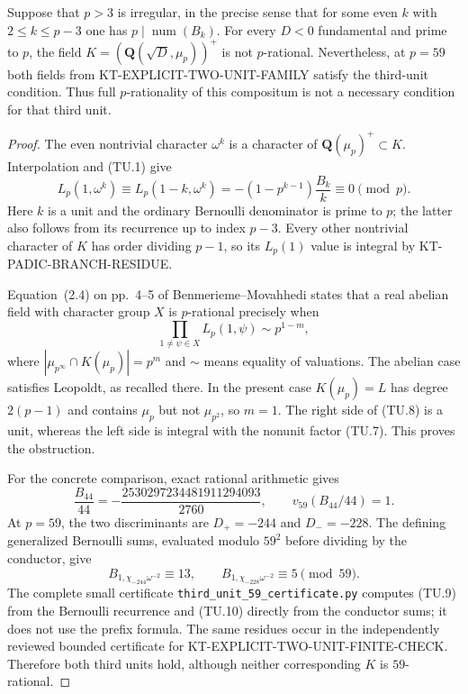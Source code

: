 \begin{proposition}
Suppose that $p>3$ is irregular, in the precise sense that for
some even $k$ with $2\le k\le p-3$ one has
$p\mid\operatorname{num}(B_k)$.  For every $D<0$ fundamental
and prime to $p$, the field
$K=(\mathbf Q(\sqrt D,\mu_p))^+$ is not $p$-rational.
Nevertheless, at $p=59$ both fields from
KT-EXPLICIT-TWO-UNIT-FAMILY satisfy the third-unit condition.
Thus full $p$-rationality of this compositum is not a necessary
condition for that third unit.
\end{proposition}
\begin{proof}
The even nontrivial character $\omega^k$ is a character of
$\mathbf Q(\mu_p)^+\subset K$.  Interpolation and (TU.1) give
\[
 L_p(1,\omega^k)\equiv L_p(1-k,\omega^k)
       =-(1-p^{k-1})\frac{B_k}{k}\equiv0\pmod p.          \tag{TU.7}
\]
Here $k$ is a unit and the ordinary Bernoulli denominator is
prime to $p$; the latter also follows from its recurrence up
to index $p-3$.  Every other nontrivial character of $K$ has
order dividing $p-1$, so its $L_p(1)$ value is integral by
KT-PADIC-BRANCH-RESIDUE.

Equation~(2.4) on pp.~4--5 of Benmerieme--Movahhedi states
that a real abelian field with character group $X$ is
$p$-rational precisely when
\[
             \prod_{1\ne\psi\in X}L_p(1,\psi)
                     \sim p^{1-m},                       \tag{TU.8}
\]
where $|\mu_{p^\infty}\cap K(\mu_p)|=p^m$ and $\sim$
means equality of valuations.  The abelian case satisfies
Leopoldt, as recalled there.  In the present case
$K(\mu_p)=L$ has degree $2(p-1)$ and contains $\mu_p$ but
not $\mu_{p^2}$, so $m=1$.  The right side of (TU.8) is a
unit, whereas the left side is integral with the nonunit
factor (TU.7).  This proves the obstruction.

For the concrete comparison, exact rational arithmetic gives
\[
 \frac{B_{44}}{44}
       =-\frac{2530297234481911294093}{2760},\qquad
       v_{59}(B_{44}/44)=1.                                \tag{TU.9}
\]
At $p=59$, the two discriminants are $D_+=-244$ and
$D_-=-228$.  The defining generalized Bernoulli sums, evaluated
modulo $59^2$ before dividing by the conductor, give
\[
 B_{1,\chi_{-244}\omega^{-2}}\equiv13,\qquad
 B_{1,\chi_{-228}\omega^{-2}}\equiv5\pmod{59}.             \tag{TU.10}
\]
The complete small certificate
\texttt{third\_unit\_59\_certificate.py} computes (TU.9)
from the Bernoulli recurrence and (TU.10) directly from the
conductor sums; it does not use the prefix formula.  The
same residues occur in the independently reviewed bounded
certificate for KT-EXPLICIT-TWO-UNIT-FINITE-CHECK.  Therefore
both third units hold, although neither corresponding $K$
is $59$-rational.
\end{proof}

